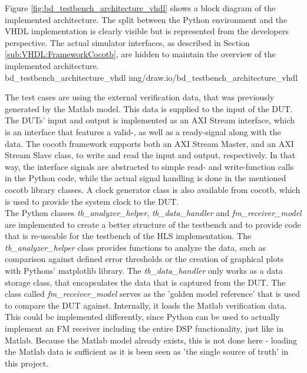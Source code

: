 Figure \ref{fig:bd_testbench_architecture_vhdl} shows a block diagram of the implemented architecture.
The split between the Python environment and the VHDL implementation is clearly visible but is represented from the developers perspective.
The actual simulator interfaces, as described in Section \ref{sub:VHDL:FrameworkCocotb}, are hidden to maintain the overview of the implemented architecture.\\

 {bd_testbench_architecture_vhdl} {img/draw.io/bd_testbench_architecture_vhdl}

The test cases are using the external verification data, that was previously generated by the Matlab model.
This data is supplied to the input of the DUT.
The DUTs' input and output is implemented as an AXI Stream interface, which is an interface that features a valid-, as well as a ready-signal along with the data.
The cocotb framework supports both an AXI Stream Master, and an AXI Stream Slave class, to write and read the input and output, respectively.
In that way, the interface signals are abstracted to simple read- and write-function calls in the Python code, while the actual signal handling is done in the mentioned cocotb library classes.
A clock generator class is also available from cocotb, which is used to provide the system clock to the DUT.\\

The Python classes \textit{tb\_analyzer\_helper}, \textit{tb\_data\_handler} and \textit{fm\_receiver\_model} are implemented to create a better structure of the testbench and to provide code that is re-useable for the testbench of the HLS implementation.
The \textit{tb\_analyzer\_helper} class provides functions to analyze the data, such as comparison against defined error thresholds or the creation of graphical plots with Pythons' matplotlib library.
The \textit{tb\_data\_handler} only works as a data storage class, that encapsulates the data that is captured from the DUT.
The class called \textit{fm\_receiver\_model} serves as the 'golden model reference' that is used to compare the DUT against.
Internally, it loads the Matlab verification data.
This could be implemented differently, since Python can be used to actually implement an FM receiver including the entire DSP functionality, just like in Matlab.
Because the Matlab model already exists, this is not done here - loading the Matlab data is sufficient as it is been seen as 'the single source of truth' in this project.\\

